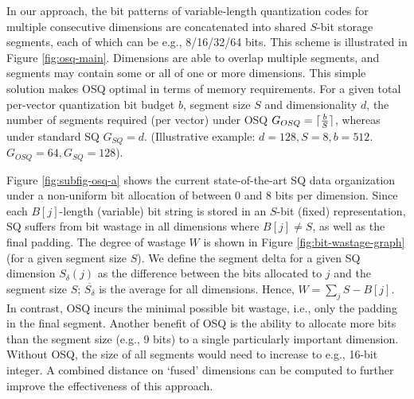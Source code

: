 In our approach, the bit patterns of variable-length quantization codes for multiple consecutive dimensions are concatenated into shared $S$-bit storage segments, each of which can be e.g., 8/16/32/64 bits.
This scheme is illustrated in Figure \ref{fig:osq-main}.
Dimensions are able to overlap multiple segments, and segments may contain some or all of one or more dimensions.
This simple solution makes OSQ optimal in terms of memory requirements. For a given total per-vector quantization bit budget $b$, segment size $S$ and dimensionality $d$, the number of segments required (per vector) under OSQ $G_{OSQ} = \lceil\frac{b}{S}\rceil$, whereas under standard SQ $G_{SQ} = d$. 
(Illustrative example: $d = 128, S = 8, b = 512$. $G_{OSQ} = 64, G_{SQ} = 128$).


Figure \ref{fig:subfig-osq-a} shows the current state-of-the-art SQ data organization under a non-uniform bit allocation of between 0 and 8 bits per dimension.
Since each $B[j]$-length (variable) bit string is stored in an $S$-bit (fixed) representation, SQ suffers from bit wastage in all dimensions where $B[j] \neq S$, as well as the final padding. The degree of wastage $W$ is shown in Figure \ref{fig:bit-wastage-graph} (for a given segment size $S$). We define the segment delta for a given SQ dimension $S_{\delta}(j)$ as the difference between the bits allocated to $j$ and the segment size $S$; $\overline{S_{\delta}}$ is the average for all dimensions. Hence, $W = \sum_{j} S - B[j]$.
In contrast, OSQ incurs the minimal possible bit wastage, i.e., only the padding in the final segment. 
Another benefit of OSQ is the ability to allocate more bits than the segment size (e.g., 9 bits) to a single particularly important dimension. Without OSQ, the size of all segments would need to increase to e.g., 16-bit integer. %
A combined distance on `fused' dimensions can be computed to further improve the effectiveness of this approach.

